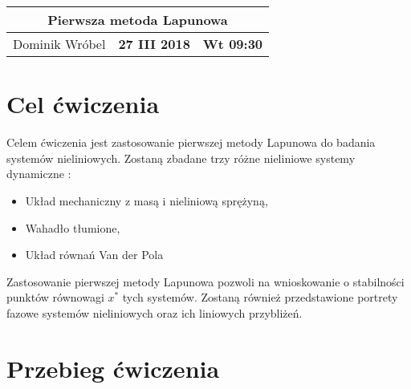 \documentclass[a4paper,11pt]{article}
\begin{document}
\begin{table}
\begin{center}
\begin{tabular}{|l|l|l|}
\hline
\multicolumn{3}{|c|}{\textbf{Pierwsza metoda Lapunowa}} \\ \hline Dominik Wróbel & \textbf{27 III 2018} & \textbf{Wt 09:30} \\ \hline

\end{tabular}
\end{center}
\end{table}

\section{Cel ćwiczenia}
Celem ćwiczenia jest zastosowanie pierwszej metody Lapunowa do badania systemów nieliniowych. Zostaną zbadane trzy różne nieliniowe systemy dynamiczne :
\begin{itemize}
\item Układ mechaniczny z masą i nieliniową sprężyną,
\item Wahadło tłumione,
\item Układ równań Van der Pola
\end{itemize} 
Zastosowanie pierwszej metody Lapunowa pozwoli na wnioskowanie o stabilności punktów równowagi \(x^{*}\) tych systemów. Zostaną również przedstawione portrety fazowe systemów nieliniowych oraz ich liniowych przybliżeń.
\section{Przebieg ćwiczenia}
\end{document}
